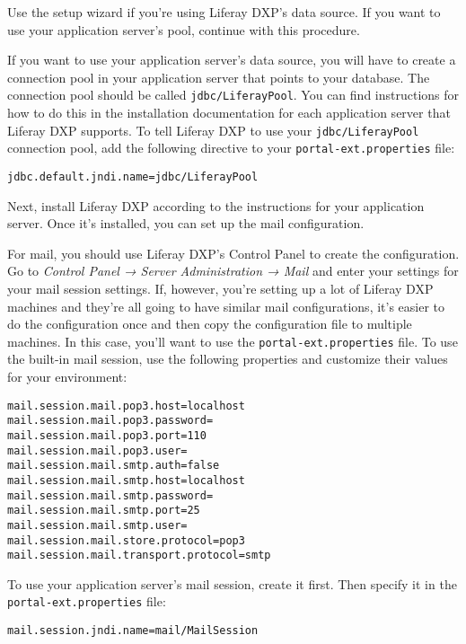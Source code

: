Use the setup wizard if you're using Liferay DXP's data source. If you
want to use your application server's pool, continue with this
procedure.

If you want to use your application server's data source, you will have
to create a connection pool in your application server that points to
your database. The connection pool should be called
\texttt{jdbc/LiferayPool}. You can find instructions for how to do this
in the installation documentation for each application server that
Liferay DXP supports. To tell Liferay DXP to use your
\texttt{jdbc/LiferayPool} connection pool, add the following directive
to your \texttt{portal-ext.properties} file:

\begin{verbatim}
jdbc.default.jndi.name=jdbc/LiferayPool
\end{verbatim}

Next, install Liferay DXP according to the instructions for your
application server. Once it's installed, you can set up the mail
configuration.

For mail, you should use Liferay DXP's Control Panel to create the
configuration. Go to \emph{Control Panel → Server Administration → Mail}
and enter your settings for your mail session settings. If, however,
you're setting up a lot of Liferay DXP machines and they're all going to
have similar mail configurations, it's easier to do the configuration
once and then copy the configuration file to multiple machines. In this
case, you'll want to use the \texttt{portal-ext.properties} file. To use
the built-in mail session, use the following properties and customize
their values for your environment:

\begin{verbatim}
mail.session.mail.pop3.host=localhost
mail.session.mail.pop3.password=
mail.session.mail.pop3.port=110
mail.session.mail.pop3.user=
mail.session.mail.smtp.auth=false
mail.session.mail.smtp.host=localhost
mail.session.mail.smtp.password=
mail.session.mail.smtp.port=25
mail.session.mail.smtp.user=
mail.session.mail.store.protocol=pop3
mail.session.mail.transport.protocol=smtp
\end{verbatim}

To use your application server's mail session, create it first. Then
specify it in the \texttt{portal-ext.properties} file:

\begin{verbatim}
mail.session.jndi.name=mail/MailSession
\end{verbatim}

